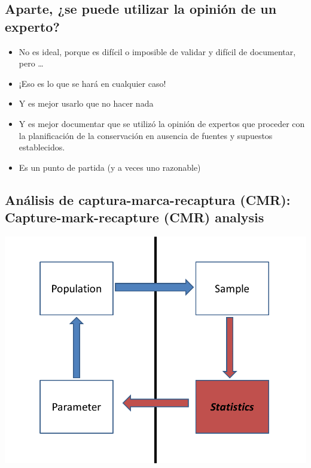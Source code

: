 \documentclass[
]{article}
\providecommand{\tightlist}{%
  \setlength{\itemsep}{0pt}\setlength{\parskip}{0pt}}
\begin{document}
\hypertarget{aparte-se-puede-utilizar-la-opiniuxf3n-de-un-experto}{%
\subsection{Aparte, ¿se puede utilizar la opinión de un
experto?}\label{aparte-se-puede-utilizar-la-opiniuxf3n-de-un-experto}}

\begin{itemize}
\tightlist
\item
  No es ideal, porque es difícil o imposible de validar y difícil de
  documentar, pero \ldots{}
\item
  ¡Eso es lo que se hará en cualquier caso!
\item
  Y es mejor usarlo que no hacer nada
\item
  Y es mejor documentar que se utilizó la opinión de expertos que
  proceder con la planificación de la conservación en ausencia de
  fuentes y supuestos establecidos.
\item
  Es un punto de partida (y a veces uno razonable)
\end{itemize}

\hypertarget{anuxe1lisis-de-captura-marca-recaptura-cmr-capture-mark-recapture-cmr-analysis}{%
\subsection{Análisis de captura-marca-recaptura (CMR):
Capture-mark-recapture (CMR)
analysis}\label{anuxe1lisis-de-captura-marca-recaptura-cmr-capture-mark-recapture-cmr-analysis}}

\includegraphics{figures/statistics1.png}
\end{document}
